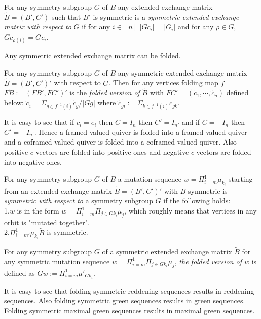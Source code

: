 \begin{definition}
For any symmetry subgroup $G$ of $B$ any extended exchange matrix $\tilde{B}=(B',C')$ such that $B'$ is symmetric is a \textit{symmetric extended exchange matrix with respect to} $G$ if for any $i\in [n]$ $|Gc_i|=|G_i|$ and for any $\rho\in G$, $Gc_{\rho(i)}=Gc_i$.\\
\end{definition}
\indent Any symmetric extended exchange matrix can be folded.\\
\begin{definition}
For any symmetry subgroup $G$ of $B$ any symmetric extended exchange matrix $\tilde{B}=(B',C')'$ with respect to $G$. Then for any vertices folding map $f$ $F\tilde{B}:=(FB',FC')'$ is the \textit{folded version of} $\tilde{B}$ with $FC'=(\tilde{c}_1,\cdots, \tilde{c}_n)$ defined below: $\tilde{c}_i=\Sigma_{g\in f^{-1}(i)} \tilde{c}_g/|Gg|$ where $\tilde{c}_{gi}:=\Sigma_{k\in f^{-1}(i)} c_{gk}$.\\
\end{definition}
\indent It is easy to see that if $c_i=e_i$ then $C=I_n$ then $C'=I_{n'}$ and if $C=-I_n$ then $C'=-I_{n'}$. Hence a framed valued quiver is folded into a framed valued quiver and a coframed valued quiver is folded into a coframed valued quiver. Also positive $c$-vectors are folded into positive ones and negative $c$-vectors are folded into negative ones.\\
\begin{definition}
For any symmetry subgroup $G$ of $B$ a mutation sequence $w=\Pi_{i=m}^1 \mu_{k_i}$ starting from an extended exchange matrix $\tilde{B}=(B',C')'$ with $B$ symmetric is \textit{symmetric with respect to } a symmetry subgroup $G$ if the following holds:\\
1.$w$ is in the form $w=\Pi_{i=m}^1 \Pi_{j\in Gk_i} \mu_j$, which roughly means that vertices in any orbit is "mutated together".\\
2.$\Pi_{i=m'}^1 \mu_{k_i} \tilde{B}$ is symmetric.\\
\end{definition}
\begin{definition}
For any symmetry subgroup $G$ of a symmetric extended exchange matrix $\tilde{B}$ for any symmetric mutation sequence $w=\Pi_{i=m}^1 \Pi_{j\in Gk_i} \mu_j$, \textit{the folded version of $w$} is defined as $Gw:=\Pi_{i=m}^1 \mu'_{Gk_i}$.
\end{definition}
\indent It is easy to see that folding symmetric reddening sequences results in reddening sequences. Also folding symmetric green sequences results in green sequences. Folding symmetric maximal green sequences results in maximal green sequences.\\
